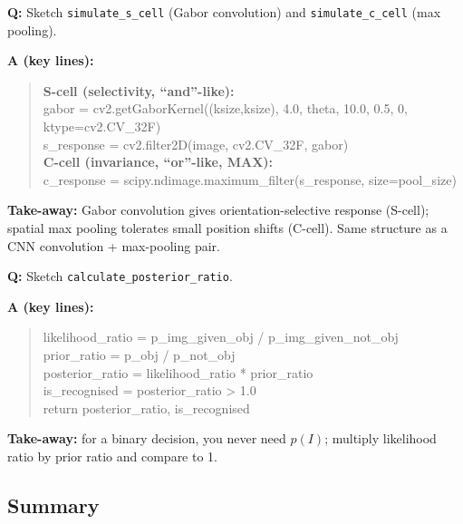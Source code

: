 \begin{exbox}
\textbf{Q:} Sketch \texttt{simulate\_s\_cell} (Gabor convolution) and \texttt{simulate\_c\_cell} (max pooling).

\textbf{A (key lines):}
\begin{quote}\ttfamily
\textbf{S-cell (selectivity, ``and''-like):}\\
gabor = cv2.getGaborKernel((ksize,ksize), 4.0, theta, 10.0, 0.5, 0, ktype=cv2.CV\_32F)\\
s\_response = cv2.filter2D(image, cv2.CV\_32F, gabor)\\[4pt]
\textbf{C-cell (invariance, ``or''-like, MAX):}\\
c\_response = scipy.ndimage.maximum\_filter(s\_response, size=pool\_size)
\end{quote}
\textbf{Take-away:} Gabor convolution gives orientation-selective response (S-cell); spatial max pooling tolerates small position shifts (C-cell). Same structure as a CNN convolution + max-pooling pair.
\end{exbox}

\begin{exbox}
\textbf{Q:} Sketch \texttt{calculate\_posterior\_ratio}.

\textbf{A (key lines):}
\begin{quote}\ttfamily
likelihood\_ratio = p\_img\_given\_obj / p\_img\_given\_not\_obj\\
prior\_ratio = p\_obj / p\_not\_obj\\
posterior\_ratio = likelihood\_ratio * prior\_ratio\\
is\_recognised = posterior\_ratio > 1.0\\
return posterior\_ratio, is\_recognised
\end{quote}
\textbf{Take-away:} for a binary decision, you never need $p(I)$; multiply likelihood ratio by prior ratio and compare to 1.
\end{exbox}

\bigseparator

\subsection{Summary}

